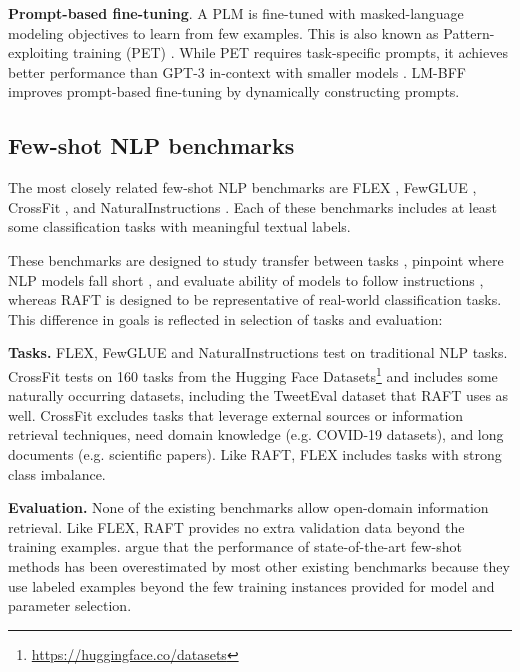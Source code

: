 \documentclass{article}
\newcommand{\name}{\textsc{RAFT}}
\begin{document}
\textbf{Prompt-based fine-tuning}. A PLM is fine-tuned with masked-language modeling objectives to learn from few examples. This is also known as Pattern-exploiting training (PET) \citep{schick2021exploiting}. While PET requires task-specific prompts, it achieves better performance than GPT-3 in-context with smaller models \citep{schick2021its}. LM-BFF \citep{gao2021making} improves prompt-based fine-tuning by dynamically constructing prompts.


\subsection{Few-shot NLP benchmarks}

The most closely related few-shot NLP benchmarks are FLEX \cite{bragg2021flex}, FewGLUE \cite{schick2021its}, CrossFit \cite{ye2021crossfit}, and NaturalInstructions \cite{mishra2021natural}. Each of these benchmarks includes at least some classification tasks with meaningful textual labels.

These benchmarks are designed to study transfer between tasks \citep{bragg2021flex, ye2021crossfit}, pinpoint where NLP models fall short \citep{schick2021its}, and evaluate ability of models to follow instructions \citep{mishra2021natural}, whereas \name{} is designed to be representative of real-world classification tasks. This difference in goals is reflected in selection of tasks and evaluation:



\textbf{Tasks.} FLEX, FewGLUE and NaturalInstructions test on traditional NLP tasks. CrossFit tests on 160 tasks from the Hugging Face Datasets\footnote{\href{https://huggingface.co/datasets}{https://huggingface.co/datasets}} and includes some naturally occurring datasets, including the TweetEval dataset \citep{barbieri-etal-2020-tweeteval} that \name{} uses as well. CrossFit excludes tasks that leverage external sources or information retrieval techniques, need domain knowledge (e.g. COVID-19 datasets), and long documents (e.g. scientific papers). Like \name{}, FLEX includes tasks with strong class imbalance. 


\textbf{Evaluation.} None of the existing benchmarks allow open-domain information retrieval. Like FLEX, \name{} provides no extra validation data beyond the training examples. \citet{perez2021true} argue that the performance of state-of-the-art few-shot methods has been overestimated by most other existing benchmarks because they use labeled examples beyond the few training instances provided for model and parameter selection.
\end{document}
